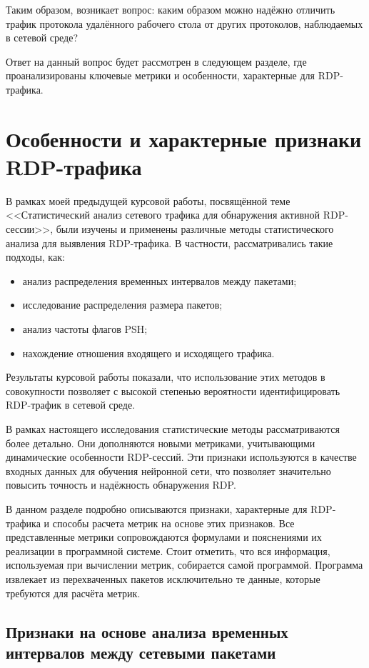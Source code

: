 \documentclass[bachelor, och, coursework]{SCWorks}
\begin{document}
Таким образом, возникает вопрос: каким образом можно надёжно отличить трафик протокола удалённого рабочего стола от других протоколов, наблюдаемых в сетевой среде?

Ответ на данный вопрос будет рассмотрен в следующем разделе, где проанализированы ключевые метрики и особенности, характерные для RDP-трафика.

\section{Особенности и характерные признаки RDP-трафика}

В рамках моей предыдущей курсовой работы, посвящённой теме <<Статистический анализ сетевого трафика для обнаружения активной RDP-сессии>>, 
были изучены и применены различные методы статистического анализа для выявления RDP-трафика. В частности, рассматривались такие подходы, как:  

\begin{itemize}
  \item анализ распределения временных интервалов между пакетами;  
  \item исследование распределения размера пакетов;  
  \item анализ частоты флагов PSH;  
  \item нахождение отношения входящего и исходящего трафика.  
\end{itemize}

Результаты курсовой работы показали, что использование этих методов в совокупности позволяет с высокой степенью вероятности идентифицировать 
RDP-трафик в сетевой среде.  


В рамках настоящего исследования статистические методы рассматриваются более детально. Они дополняются новыми метриками, 
учитывающими динамические особенности RDP-сессий. Эти признаки используются в качестве входных данных для обучения нейронной сети, что позволяет 
значительно повысить точность и надёжность обнаружения RDP.

В данном разделе подробно описываются признаки, характерные для RDP-трафика и способы расчета метрик на основе этих признаков.
Все представленные метрики сопровождаются формулами и пояснениями их реализации в программной системе. Стоит отметить, что вся информация, 
используемая при вычислении метрик, собирается самой программой. Программа извлекает из перехваченных пакетов исключительно те данные, которые 
требуются для расчёта метрик.

\subsection{Признаки на основе анализа временных интервалов между сетевыми пакетами}
\end{document}
